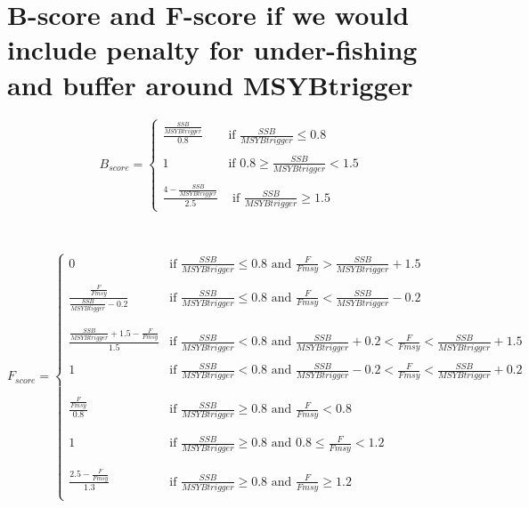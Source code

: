 \documentclass[
]{article}
\begin{document}
\hypertarget{b-score-and-f-score-if-we-would-include-penalty-for-under-fishing-and-buffer-around-msybtrigger}{%
\section{B-score and F-score if we would include penalty for
under-fishing and buffer around
MSYBtrigger}\label{b-score-and-f-score-if-we-would-include-penalty-for-under-fishing-and-buffer-around-msybtrigger}}

\[
\begin{equation}
  B_{score} =
    \begin{cases}
      \frac{\frac{SSB}{MSYBtrigger}}{0.8} & \text{if $\frac{SSB}{MSYBtrigger} \le 0.8$}\\
    \\
      1 & \text{if $0.8  \ge\frac{SSB}{MSYBtrigger} < 1.5 $}\\
    \\
      \frac{4 - \frac{SSB}{MSYBtrigger}}{2.5}  & \text{ if $\frac{SSB}{MSYBtrigger} \ge 1.5$}
    \end{cases}       
\end{equation}
 \]

\(~\) \(~\) \(~\) \(~\) \(~\) \(~\)

\[
\begin{equation}
  F_{score} =
    \begin{cases}
    0  & \text{if $\frac{SSB}{MSYBtrigger} \le 0.8$ and $\frac{F}{Fmsy} > \frac{SSB}{MSYBtrigger}+ 1.5$}\\
    \\  
    \frac{\frac{F}{Fmsy}}{\frac{SSB}{MSYBtigger} - 0.2} & \text{if $\frac{SSB}{MSYBtrigger} \le 0.8$ and $\frac{F}{Fmsy} < \frac{SSB}{MSYBtrigger} - 0.2$}\\
      \\
      \\
       \frac{\frac{SSB}{MSYBtrigger}+1.5 -\frac{F}{Fmsy}}{1.5} & \text{if $\frac{SSB}{MSYBtrigger} < 0.8$ and $\frac{SSB}{MSYBtrigger}+0.2 < \frac{F}{Fmsy} < \frac{SSB}{MSYBtrigger} +1.5$}
      \\
      \\
      1  & \text{if $\frac{SSB}{MSYBtrigger} < 0.8$ and $\frac{SSB}{MSYBtrigger}-0.2 < \frac{F}{Fmsy} < \frac{SSB}{MSYBtrigger}+0.2$}\\
      \\
      \\
      \frac{\frac{F}{Fmsy}}{0.8} & \text{if $\frac{SSB}{MSYBtrigger} \ge 0.8$ and $\frac{F}{Fmsy} < 0.8$}\\
      \\
      \\
      1 & \text{if $\frac{SSB}{MSYBtrigger} \ge 0.8$ and   $0.8 \le \frac{F}{Fmsy} < 1.2$}\\
      \\
      \\
      \frac{2.5 - \frac{F}{Fmsy}}{1.3} & \text{if $\frac{SSB}{MSYBtrigger} \ge 0.8$  and $\frac{F}{Fmsy} \ge 1.2$}\\
    \end{cases}       
\end{equation}
 \]
\end{document}
